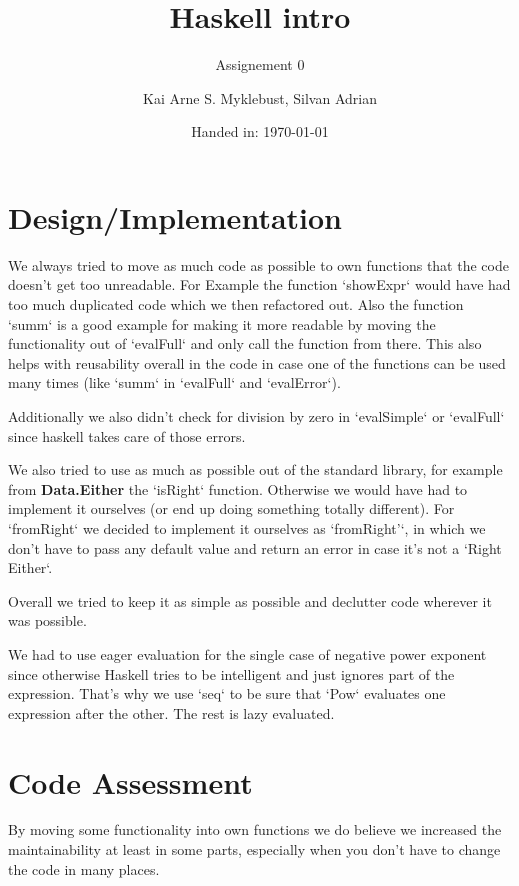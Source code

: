 \documentclass[12pt,a4paper]{article}
\begin{document}
\title{Haskell intro}
\subtitle{Assignement 0}

\author{Kai Arne S. Myklebust, Silvan Adrian}
\date{Handed in: \today}
	
\maketitle
\tableofcontents

\section{Design/Implementation}
We always tried to move as much code as possible to own functions that the code doesn't get too unreadable.
For Example the function `showExpr` would have had too much duplicated code which we then refactored out.
Also the function `summ` is a good example for making it more readable by moving the functionality out of `evalFull` and only call the function from there.
This also helps with reusability overall in the code in case one of the functions can be used many times (like `summ` in `evalFull` and `evalError`).

Additionally we also didn't check for division by zero in `evalSimple` or `evalFull` since haskell takes care of those errors.

We also tried to use as much as possible out of the standard library, for example from \textbf{Data.Either} the `isRight` function. Otherwise we would have had to implement it ourselves (or end up doing something totally different). For `fromRight` we decided to implement it ourselves as `fromRight'`, in which we don't have to pass any default value and return an error in case it's not a `Right Either`.

Overall we tried to keep it as simple as possible and declutter code wherever it was possible. \newline

We had to use eager evaluation for the single case of negative power exponent since otherwise Haskell tries to be intelligent and just ignores part of the expression.
That's why we use `seq` to be sure that `Pow` evaluates one expression after the other.
The rest is lazy evaluated.



\section{Code Assessment}

By moving some functionality into own functions we do believe we increased the maintainability at least in some parts, especially when you don't have to change the code in many places.
\end{document}
